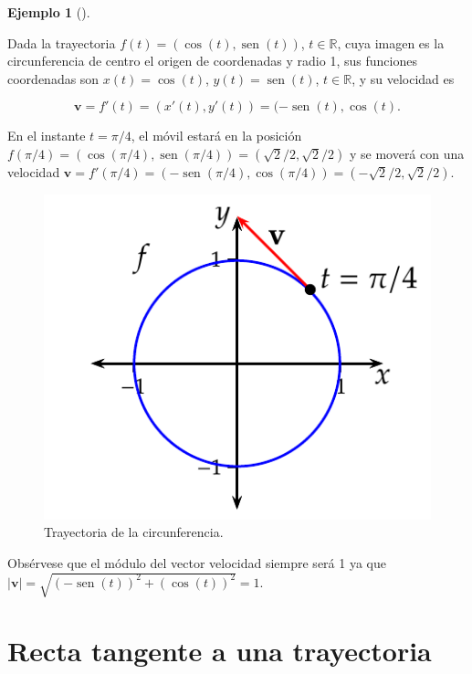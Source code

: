\documentclass[
  a4paper,
]{scrreport}
\theoremstyle{definition}
\newtheorem{example}{Ejemplo}[chapter]
\theoremstyle{plain}
\theoremstyle{definition}
\theoremstyle{definition}
\theoremstyle{plain}
\theoremstyle{plain}
\theoremstyle{remark}
\begin{document}
\begin{example}[]\protect\hypertarget{exm-movimiento-curvilineo}{}\label{exm-movimiento-curvilineo}

Dada la trayectoria \(f(t) = (\cos(t),\operatorname{sen}(t))\),
\(t\in \mathbb{R}\), cuya imagen es la circunferencia de centro el
origen de coordenadas y radio 1, sus funciones coordenadas son
\(x(t) = \cos(t)\), \(y(t) = \operatorname{sen}(t)\),
\(t\in \mathbb{R}\), y su velocidad es

\[
\mathbf{v}=f'(t)=(x'(t),y'(t))=(-\operatorname{sen}(t), \cos(t).
\]

En el instante \(t=\pi/4\), el móvil estará en la posición
\(f(\pi/4) = (\cos(\pi/4),\operatorname{sen}(\pi/4)) =(\sqrt{2}/2,\sqrt{2}/2)\)
y se moverá con una velocidad
\(\mathbf{v}=f'(\pi/4)=(-\operatorname{sen}(\pi/4),\cos(\pi/4))=(-\sqrt{2}/2,\sqrt{2}/2)\).

\begin{figure}[H]

{\centering \includegraphics{img/derivadas/circunferencia.png}

}

\caption{Trayectoria de la circunferencia.}

\end{figure}%

Obsérvese que el módulo del vector velocidad siempre será 1 ya que
\(\lvert \mathbf{v}\rvert = \sqrt{(-\operatorname{sen}(t))^2+(\cos(t))^2}=1\).

\end{example}

\section{Recta tangente a una
trayectoria}\label{recta-tangente-a-una-trayectoria}
\end{document}

